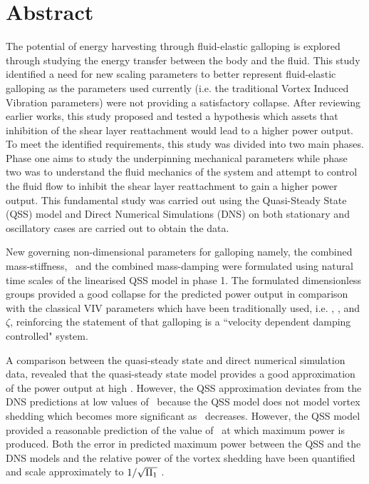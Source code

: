 \chapter*{Abstract}

The potential of energy harvesting through fluid-elastic galloping is explored through studying the energy transfer between the body and the fluid. This study identified a need for new scaling parameters to better represent fluid-elastic galloping as the parameters used currently (i.e. the traditional Vortex Induced Vibration parameters) were not providing a satisfactory collapse. After reviewing earlier works, this study proposed and tested a hypothesis which assets that inhibition of the shear layer reattachment would lead to a higher power output. To meet the identified requirements, this study was divided into two main phases. Phase one aims to study the underpinning mechanical parameters while phase two was to understand the fluid mechanics of the system and attempt to control the fluid flow to inhibit the shear layer reattachment to gain a higher power output. This fundamental study  was carried out using the Quasi-Steady State (QSS) model and Direct Numerical Simulations (DNS) on both stationary and oscillatory cases are carried out to obtain the data.

New governing non-dimensional parameters for galloping namely, the combined mass-stiffness, \massstiff\, and the combined mass-damping \massdamp were formulated using natural time scales of the linearised QSS model in phase 1. The formulated dimensionless groups provided a good collapse for the predicted power output in comparison with the classical VIV parameters which have been traditionally used, i.e. \ustar, \mstar, and $\zeta$, reinforcing the statement of \citet{Paidoussis2010} that galloping is a ``velocity dependent damping controlled" system.  

A comparison between the quasi-steady state and direct numerical simulation data, revealed that the quasi-steady state model provides a good approximation of the power output at high \massstiff. However, the QSS approximation deviates from the DNS predictions at low values of \massstiff\ because the QSS model does not model vortex shedding which becomes more significant as \massstiff\ decreases. However, the QSS model provided a reasonable prediction of the value of \massdamp\ at which maximum power is produced. Both the error in predicted maximum power between the QSS and the DNS models and the relative power of the vortex shedding have been quantified and scale approximately to $1/\sqrt{\Pi_1}$ .
 
